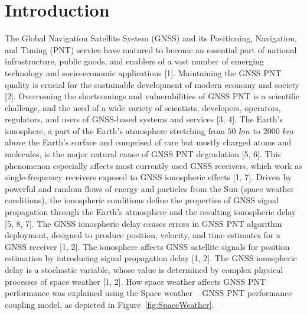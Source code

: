\let\LaTeXcline\cline\documentclass[sn-mathphys-num]{sn-jnl}\let\cline\LaTeXcline
\begin{document}



\maketitle

\section{Introduction}

The Global Navigation Satellite System (GNSS) and its Positioning, Navigation, and Timing (PNT) service have matured to become an essential part of national infrastructure, public goods, and enablers of a vast number of emerging technology and socio-economic applications [1]. Maintaining the GNSS PNT quality is crucial for the sustainable development of modern economy and society [2]. Overcoming the shortcomings and vulnerabilities of GNSS PNT is a scientific challenge, and the need of a wide variety of scientists, developers, operators, regulators, and users of GNSS-based systems and services [3, 4]. The Earth’s ionosphere, a part of the Earth’s atmosphere stretching from $50$ $km$ to $2000$ $km$ above the Earth’s surface and comprised of rare but mostly charged atoms and molecules, is the major natural cause of GNSS PNT degradation [5, 6]. This phenomenon especially affects most currently used GNSS receivers, which work as single-frequency receivers exposed to GNSS ionospheric effects [1, 7]. Driven by powerful and random flows of energy and particles from the Sun (space weather conditions), the ionospheric conditions define the properties of GNSS signal propagation through the Earth’s atmosphere and the resulting ionospheric delay [5, 8, 7]. The GNSS ionospheric delay causes errors in GNSS PNT algorithm deployment, designed to produce position, velocity, and time estimates for a GNSS receiver [1, 2]. The ionosphere affects GNSS satellite signals for position estimation by introducing signal propagation delay [1, 2]. The GNSS ionospheric delay is a stochastic variable, whose value is determined by complex physical processes of space weather [1, 2]. How space weather affects GNSS PNT performance was explained using the Space weather – GNSS PNT performance coupling model, as depicted in Figure~\ref{fig:SpaceWeather}.
\end{document}
